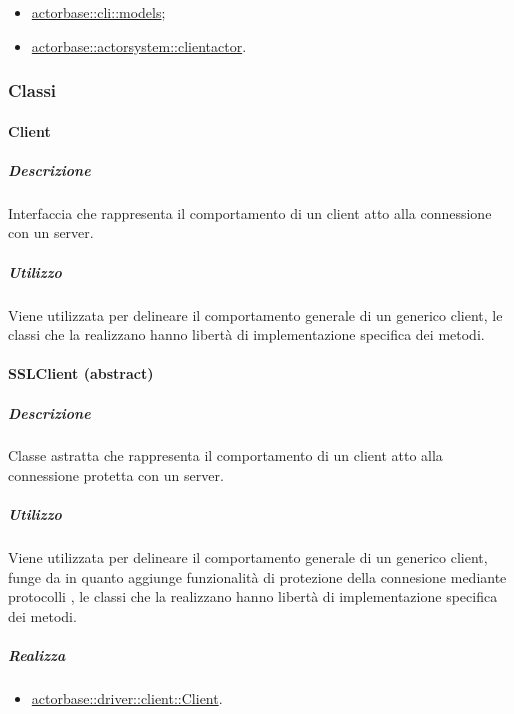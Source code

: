 \documentclass{scalatekids-article}
\begin{document}
\begin{itemize}
\item \hyperref[sec:actorbase::cli::models]{actorbase::cli::models};
\item \hyperref[sec:actorbase::actorsystem::clientactor]{actorbase::actorsystem::clientactor}.
\end{itemize}

\subsubsection{Classi}

\paragraph{Client}
\label{sec:actorbase::driver::client::Client}

\subparagraph{Descrizione}

Interfaccia che rappresenta il comportamento di un client atto alla connessione
con un server.

\subparagraph{Utilizzo}

Viene utilizzata per delineare il comportamento generale di un generico client,
le classi che la realizzano hanno libertà di implementazione specifica dei
metodi.

\paragraph{SSLClient (abstract)}
\label{sec:actorbase::driver::client::SSLClient}

\subparagraph{Descrizione}

Classe astratta che rappresenta il comportamento di un client atto alla connessione
protetta con un server.

\subparagraph{Utilizzo}

Viene utilizzata per delineare il comportamento generale di un generico client,
funge da  in quanto aggiunge funzionalità di protezione della
connesione mediante protocolli , le classi che la realizzano
hanno libertà di implementazione specifica dei metodi.

\subparagraph{Realizza}

\begin{itemize}
\item \hyperref[sec:actorbase::driver::client::Client]{actorbase::driver::client::Client}.
\end{itemize}
\end{document}
